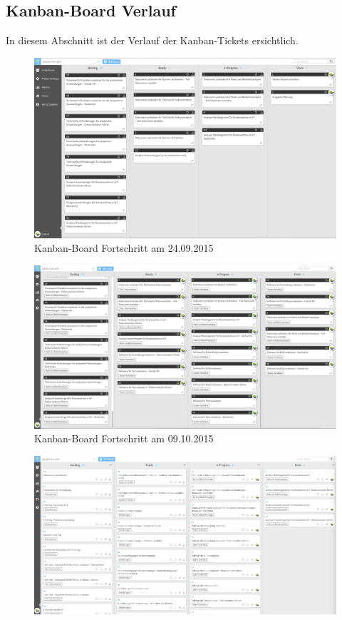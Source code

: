 \begin{landscape}
\section{Kanban-Board Verlauf}
In diesem Abschnitt ist der Verlauf der Kanban-Tickets ersichtlich.
\begin{figure}[H]
  \centering
  \includegraphics[scale=0.37]{98_Bilder/98_Anhang/20150924_Kanban_board}
  \caption[Kanban-Board 24.09.2015]{Kanban-Board Fortschritt am 24.09.2015}
\end{figure}
\begin{figure}[H]
  \centering
  \includegraphics[scale=0.37]{98_Bilder/98_Anhang/20151009_Kanban_board}
  \caption[Kanban-Board 09.10.2015]{Kanban-Board Fortschritt am 09.10.2015}
\end{figure}
\begin{figure}[H]
  \centering
  \includegraphics[scale=0.37]{98_Bilder/98_Anhang/20151130_Kanban_board}

\end{figure}
\end{landscape}
